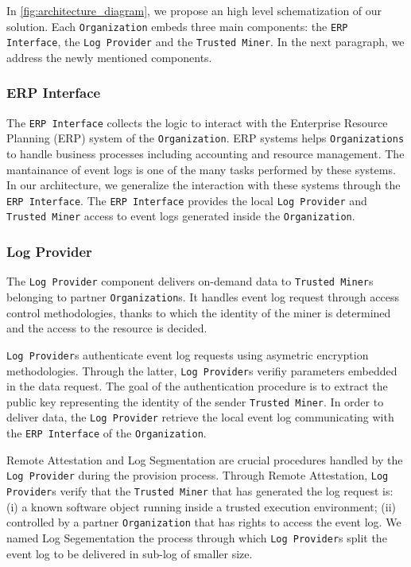 In \cref{fig:architecture_diagram}, we propose an high level schematization of our solution. Each \texttt{Organization} embeds three main components: the \texttt{ERP Interface}, the \texttt{Log Provider} and the \texttt{Trusted Miner}. In the next paragraph, we address the newly mentioned components.
\subsubsection{ERP Interface}
The \texttt{ERP Interface} collects the logic to interact with the Enterprise Resource Planning (ERP) system  of the \texttt{Organization}. ERP systems helps \texttt{Organizations} to
handle business processes including accounting and resource management. The mantainance of event logs is one of the many tasks performed by these systems. In our architecture, we generalize the interaction with these systems through the \texttt{ERP Interface}. The \texttt{ERP Interface} provides the local \texttt{Log Provider} and \texttt{Trusted Miner} access to event logs generated inside the \texttt{Organization}.
\subsubsection{Log Provider}
The \texttt{Log Provider} component delivers on-demand data to \texttt{Trusted Miner}s belonging to partner \texttt{Organization}s. It handles event log request through access control methodologies, thanks to which the identity of the miner is determined and the access to the resource is decided.

\texttt{Log Provider}s authenticate event log requests using asymetric encryption methodologies. Through the latter, \texttt{Log Provider}s verifiy parameters embedded in the data request. The goal of the authentication procedure is to extract the public key representing the identity of the sender \texttt{Trusted Miner}. In order to deliver data, the \texttt{Log Provider} retrieve the local event log communicating with the \texttt{ERP Interface} of the \texttt{Organization}.

Remote Attestation and Log Segmentation are crucial procedures handled by the \texttt{Log Provider} during the provision process. Through Remote Attestation, \texttt{Log Provider}s verify that the \texttt{Trusted Miner} that has generated the log request  is: (i) a known software object running inside a trusted execution environment; (ii) controlled by a partner \texttt{Organization} that has rights to access the event log. We named Log Segementation the process through which \texttt{Log Provider}s split the event log to be delivered in sub-log of smaller size.

